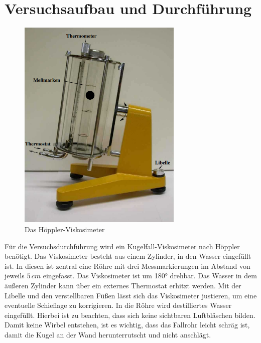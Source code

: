 \section{Versuchsaufbau und Durchführung}
\label{sec:Versuchsaufbau}

\begin{figure}[H]
    \centering
    \includegraphics[width=0.7\textwidth]{bilder/hoeppler_viskosimeter.png}
    \caption{Das Höppler-Viskosimeter\protect\footnotemark}
    \label{fig:hoeppler}
\end{figure}
Für die Versuchsdurchführung wird ein Kugelfall-Viskosimeter nach Höppler benötigt. Das Viskosimeter besteht aus einem Zylinder, in den Wasser eingefüllt ist. 
In diesen ist zentral eine Röhre mit drei Messmarkierungen im Abstand von jeweils $5\,\unit{cm}$ eingefasst. Das Viskosimeter ist um 180° drehbar.
Das Wasser in dem äußeren Zylinder kann über ein externes Thermostat erhitzt werden. Mit der Libelle und den verstellbaren Füßen lässt sich das Viskosimeter justieren, um
eine eventuelle Schieflage zu korrigieren. In die Röhre wird destilliertes Wasser eingefüllt. Hierbei ist zu beachten, dass sich keine sichtbaren Luftbläschen bilden.
Damit keine Wirbel entstehen, ist es wichtig, dass das Fallrohr leicht schräg ist, damit die Kugel an der Wand herunterrutscht und nicht anschlägt.
\\

